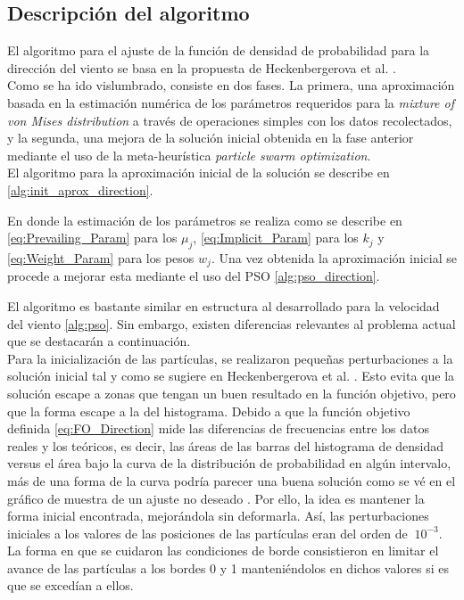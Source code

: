 \subsection{Descripción del algoritmo}
El algoritmo para el ajuste de la función de densidad de probabilidad para la dirección del viento se basa en la propuesta de Heckenbergerova et al. \cite{Heckenbergerova15}.\\ 
Como se ha ido vislumbrado, consiste en dos fases. La primera, una aproximación basada en la estimación numérica de los parámetros requeridos para la \emph{mixture of von Mises distribution} a través de operaciones simples con los datos recolectados, y la segunda, una mejora de la solución inicial obtenida en la fase anterior mediante el uso de la meta-heurística \emph{particle swarm optimization}. \\
El algoritmo para la aproximación inicial de la solución se describe en \ref{alg:init_aprox_direction}.

En donde la estimación de los parámetros se realiza como se describe en \ref{eq:Prevailing_Param} para los $\mu_j$, \ref{eq:Implicit_Param} para los $k_j$ y \ref{eq:Weight_Param} para los pesos $w_j$.
Una vez obtenida la aproximación inicial se procede a mejorar esta mediante el uso del PSO  \ref{alg:pso_direction}.

El algoritmo es bastante similar en estructura al desarrollado para la velocidad del viento \ref{alg:pso}. Sin embargo,
existen diferencias relevantes al problema actual que se destacarán a continuación.\\
Para la inicialización de las partículas, se realizaron pequeñas perturbaciones a la solución inicial tal y como se sugiere en Heckenbergerova et al. \cite{Heckenbergerova15}. Esto evita que la solución escape a zonas que tengan un buen resultado en la función objetivo, pero que la forma escape a la del histograma. Debido a que la función objetivo definida \ref{eq:FO_Direction} mide las diferencias de frecuencias entre los datos reales y los teóricos, es decir, las áreas de las barras del histograma de densidad versus el área bajo la curva de la distribución de probabilidad en algún intervalo, más de una forma de la curva podría parecer una buena solución como se vé en el gráfico de muestra de un ajuste no deseado \label{fig:pso_valpo_15_14_13_lq}. Por ello, la idea es mantener la forma inicial encontrada, mejorándola sin deformarla. Así, las perturbaciones iniciales a los valores de las posiciones de las partículas eran del orden de $~ 10^{-3}$.\\
La forma en que se cuidaron las condiciones de borde consistieron en limitar el avance de las partículas a los bordes 0 y 1 manteniéndolos en dichos valores si es que se excedían a ellos.\\
